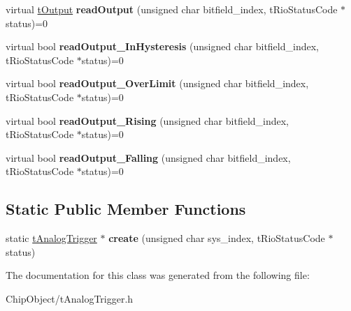 \begin{DoxyCompactItemize}
\item 
\hypertarget{classnFPGA_1_1nFRC__2012__1__6__4_1_1tAnalogTrigger_a9ab3faff149c871c6a4f8ed57ac83e0a}{
virtual \hyperlink{unionnFPGA_1_1nFRC__2012__1__6__4_1_1tAnalogTrigger_1_1tOutput}{tOutput} {\bfseries readOutput} (unsigned char bitfield\_\-index, tRioStatusCode $\ast$status)=0}
\label{classnFPGA_1_1nFRC__2012__1__6__4_1_1tAnalogTrigger_a9ab3faff149c871c6a4f8ed57ac83e0a}

\item 
\hypertarget{classnFPGA_1_1nFRC__2012__1__6__4_1_1tAnalogTrigger_a2cb93d277fd95a012e5e69c13529ab9c}{
virtual bool {\bfseries readOutput\_\-InHysteresis} (unsigned char bitfield\_\-index, tRioStatusCode $\ast$status)=0}
\label{classnFPGA_1_1nFRC__2012__1__6__4_1_1tAnalogTrigger_a2cb93d277fd95a012e5e69c13529ab9c}

\item 
\hypertarget{classnFPGA_1_1nFRC__2012__1__6__4_1_1tAnalogTrigger_ac5a1e24e85a0075e298d184fe84221d6}{
virtual bool {\bfseries readOutput\_\-OverLimit} (unsigned char bitfield\_\-index, tRioStatusCode $\ast$status)=0}
\label{classnFPGA_1_1nFRC__2012__1__6__4_1_1tAnalogTrigger_ac5a1e24e85a0075e298d184fe84221d6}

\item 
\hypertarget{classnFPGA_1_1nFRC__2012__1__6__4_1_1tAnalogTrigger_a997f4440dca5445862b17fa78c94a990}{
virtual bool {\bfseries readOutput\_\-Rising} (unsigned char bitfield\_\-index, tRioStatusCode $\ast$status)=0}
\label{classnFPGA_1_1nFRC__2012__1__6__4_1_1tAnalogTrigger_a997f4440dca5445862b17fa78c94a990}

\item 
\hypertarget{classnFPGA_1_1nFRC__2012__1__6__4_1_1tAnalogTrigger_a9fcdcd7463c7e3d0c35a2fe4955f1b6c}{
virtual bool {\bfseries readOutput\_\-Falling} (unsigned char bitfield\_\-index, tRioStatusCode $\ast$status)=0}
\label{classnFPGA_1_1nFRC__2012__1__6__4_1_1tAnalogTrigger_a9fcdcd7463c7e3d0c35a2fe4955f1b6c}

\end{DoxyCompactItemize}
\subsection*{Static Public Member Functions}
\begin{DoxyCompactItemize}
\item 
\hypertarget{classnFPGA_1_1nFRC__2012__1__6__4_1_1tAnalogTrigger_aefe34df7872be42f5a3d98b23c40f968}{
static \hyperlink{classnFPGA_1_1nFRC__2012__1__6__4_1_1tAnalogTrigger}{tAnalogTrigger} $\ast$ {\bfseries create} (unsigned char sys\_\-index, tRioStatusCode $\ast$status)}
\label{classnFPGA_1_1nFRC__2012__1__6__4_1_1tAnalogTrigger_aefe34df7872be42f5a3d98b23c40f968}

\end{DoxyCompactItemize}


The documentation for this class was generated from the following file:\begin{DoxyCompactItemize}
\item 
ChipObject/tAnalogTrigger.h\end{DoxyCompactItemize}
